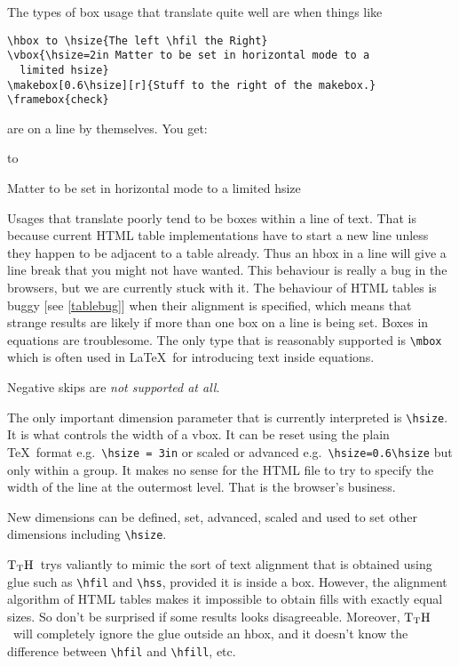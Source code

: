 \documentclass[12pt]{article}
\def\TtH{$\rm{}T_TH$}
\begin{document}
The types of box usage that translate quite well are when things like
\begin{verbatim}
\hbox to \hsize{The left \hfil the Right}
\vbox{\hsize=2in Matter to be set in horizontal mode to a 
  limited hsize}
\makebox[0.6\hsize][r]{Stuff to the right of the makebox.}
\framebox{check}
\end{verbatim}
are on a line by themselves.
You get:

\hbox to 

\vbox{\hsize=2in Matter to be set in horizontal mode to a limited hsize}



Usages that translate poorly tend to be boxes within a line of
text. That is because current HTML table implementations have to start
a new line unless they happen to be adjacent to a table already. Thus
an hbox in a line will give a line break that you might not have
wanted. This behaviour is really a bug in the browsers, but we are
currently stuck with it. The behaviour of HTML tables is buggy
[see \ref{tablebug}] when their alignment is specified, which means that
strange results are likely if more than one box on a line is being
set. Boxes in equations are troublesome. The only type that is
reasonably supported is \verb!\mbox! which is often used in \LaTeX\ for
introducing text inside equations.

Negative skips are \emph{not supported at all}.

The only important dimension parameter that is currently interpreted
is \verb!\hsize!. It is what controls the width of a vbox.  It can be
reset using the plain \TeX\ format e.g.~\verb!\hsize = 3in! or scaled
or advanced e.g.~\verb!\hsize=0.6\hsize!  but only within a group. It
makes no sense for the HTML file to try to specify the width of the
line at the outermost level. That is the browser's business.

New dimensions can be defined, set, advanced, scaled and used to set
other dimensions including \verb!\hsize!. 

\TtH\ trys valiantly to mimic the sort of text alignment that is
obtained using glue such as \verb!\hfil! and \verb!\hss!, provided it
is inside a box. However, the alignment algorithm of HTML tables makes
it impossible to obtain fills with exactly equal sizes. So don't be
surprised if some results looks disagreeable. Moreover, \TtH\ will
completely ignore the glue outside an hbox, and it doesn't know
the difference between \verb!\hfil! and \verb!\hfill!, etc.
\end{document}
